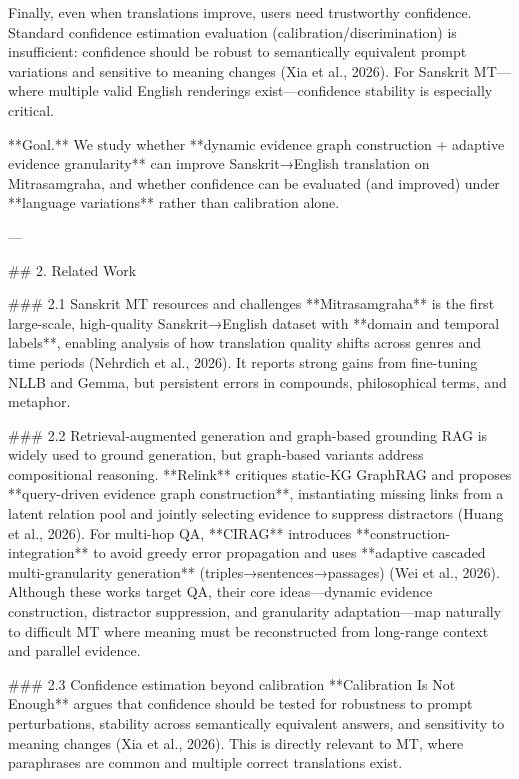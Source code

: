 Finally, even when translations improve, users need trustworthy confidence. Standard confidence estimation evaluation (calibration/discrimination) is insufficient: confidence should be robust to semantically equivalent prompt variations and sensitive to meaning changes (Xia et al., 2026). For Sanskrit MT—where multiple valid English renderings exist—confidence stability is especially critical.

**Goal.** We study whether **dynamic evidence graph construction + adaptive evidence granularity** can improve Sanskrit→English translation on Mitrasamgraha, and whether confidence can be evaluated (and improved) under **language variations** rather than calibration alone.

---

## 2. Related Work  

### 2.1 Sanskrit MT resources and challenges  
**Mitrasamgraha** is the first large-scale, high-quality Sanskrit→English dataset with **domain and temporal labels**, enabling analysis of how translation quality shifts across genres and time periods (Nehrdich et al., 2026). It reports strong gains from fine-tuning NLLB and Gemma, but persistent errors in compounds, philosophical terms, and metaphor.

### 2.2 Retrieval-augmented generation and graph-based grounding  
RAG is widely used to ground generation, but graph-based variants address compositional reasoning. **Relink** critiques static-KG GraphRAG and proposes **query-driven evidence graph construction**, instantiating missing links from a latent relation pool and jointly selecting evidence to suppress distractors (Huang et al., 2026).  
For multi-hop QA, **CIRAG** introduces **construction-integration** to avoid greedy error propagation and uses **adaptive cascaded multi-granularity generation** (triples→sentences→passages) (Wei et al., 2026).  
Although these works target QA, their core ideas—dynamic evidence construction, distractor suppression, and granularity adaptation—map naturally to difficult MT where meaning must be reconstructed from long-range context and parallel evidence.

### 2.3 Confidence estimation beyond calibration  
**Calibration Is Not Enough** argues that confidence should be tested for robustness to prompt perturbations, stability across semantically equivalent answers, and sensitivity to meaning changes (Xia et al., 2026). This is directly relevant to MT, where paraphrases are common and multiple correct translations exist.

